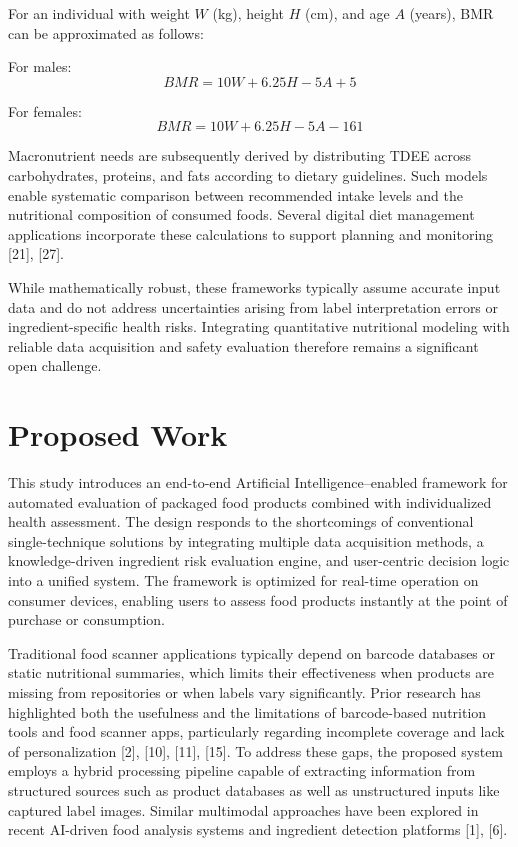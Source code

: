 \documentclass[conference]{IEEEtran}
\begin{document}
For an individual with weight $W$ (kg), height $H$ (cm), and age $A$ (years), BMR can be approximated as follows:

For males:
\begin{equation}
BMR = 10W + 6.25H - 5A + 5
\end{equation}

For females:
\begin{equation}
BMR = 10W + 6.25H - 5A - 161
\end{equation}

Macronutrient needs are subsequently derived by distributing TDEE across carbohydrates, proteins, and fats according to dietary guidelines. Such models enable systematic comparison between recommended intake levels and the nutritional composition of consumed foods. Several digital diet management applications incorporate these calculations to support planning and monitoring [21], [27].

While mathematically robust, these frameworks typically assume accurate input data and do not address uncertainties arising from label interpretation errors or ingredient-specific health risks. Integrating quantitative nutritional modeling with reliable data acquisition and safety evaluation therefore remains a significant open challenge.

\section{Proposed Work}

This study introduces an end-to-end Artificial Intelligence–enabled framework for automated evaluation of packaged food products combined with individualized health assessment. The design responds to the shortcomings of conventional single-technique solutions by integrating multiple data acquisition methods, a knowledge-driven ingredient risk evaluation engine, and user-centric decision logic into a unified system. The framework is optimized for real-time operation on consumer devices, enabling users to assess food products instantly at the point of purchase or consumption.

Traditional food scanner applications typically depend on barcode databases or static nutritional summaries, which limits their effectiveness when products are missing from repositories or when labels vary significantly. Prior research has highlighted both the usefulness and the limitations of barcode-based nutrition tools and food scanner apps, particularly regarding incomplete coverage and lack of personalization [2], [10], [11], [15]. To address these gaps, the proposed system employs a hybrid processing pipeline capable of extracting information from structured sources such as product databases as well as unstructured inputs like captured label images. Similar multimodal approaches have been explored in recent AI-driven food analysis systems and ingredient detection platforms [1], [6].
\end{document}
